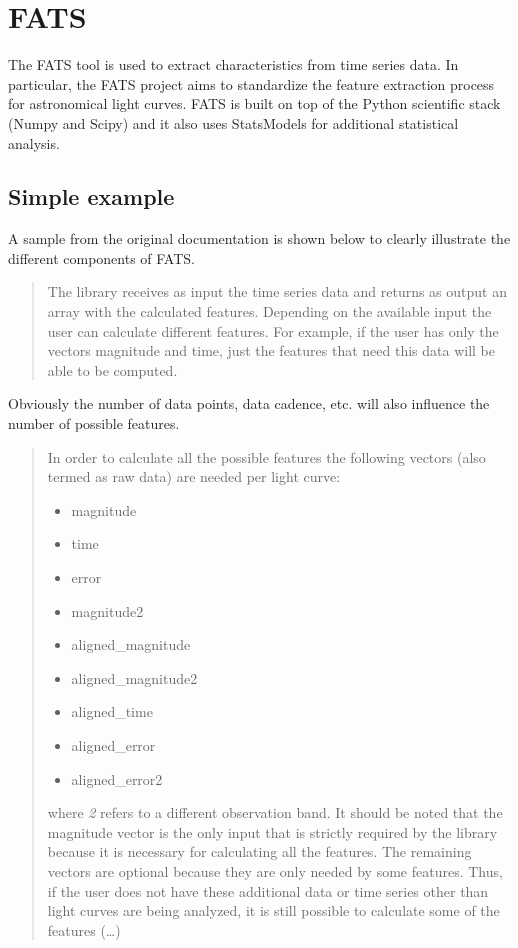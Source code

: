 \documentclass[final,5p,times,twocolumn,authoryear]{elsarticle}
\begin{document}
\section{FATS }
\label{section:FATS}
%
The FATS tool is used to extract
characteristics from time series data. 
%
In particular, the FATS project aims to
standardize the feature extraction process for astronomical
light curves. FATS is built on top of the Python scientific stack (Numpy and
Scipy) and it also uses StatsModels for additional statistical analysis.
%
\subsection{Simple example}
%
A sample 
from the original documentation is shown below to clearly illustrate the different components of FATS.
\begin{quotation}
The library receives as input the time series data and returns as output 
an array with the calculated features. Depending on the available input 
the user can calculate different features. 
For example, if the user has only the vectors magnitude and time, 
just the features that need this data will be able to be computed.
\end{quotation}
%
Obviously the number of data points, data cadence, etc. will also 
influence the number of possible features. 
%
\begin{quotation}
In order to calculate all the possible features the following vectors 
(also termed as raw data) are needed per light curve:
%
\begin{itemize}
\item magnitude
\item time
\item error
\item magnitude2
\item aligned\_magnitude
\item aligned\_magnitude2
\item aligned\_time
\item aligned\_error
\item aligned\_error2
\end{itemize}
%
where \textit{2} refers to a different observation band.
It should be noted that the magnitude vector is the only 
input that is strictly required by the library because it is necessary 
for calculating all the features. The remaining vectors are 
optional because they are only needed by some features. 
%
Thus, if the user does not have these additional data or 
time series other than light curves are being analyzed, it is still possible 
to calculate some of the features (\dots)
\end{quotation}
\end{document}
